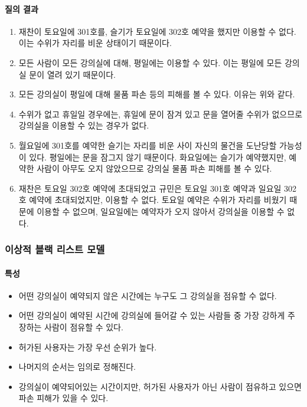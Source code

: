 \documentclass[11pt,a4paper]{article}
\begin{document}
\paragraph{질의 결과}
\begin{enumerate}
\item 재찬이 토요일에 301호를, 슬기가 토요일에 302호 예약을 했지만 이용할 수
없다. 이는 수위가 자리를 비운 상태이기 때문이다.
\item 모든 사람이 모든 강의실에 대해, 평일에는 이용할 수 있다. 이는 평일에 모든
강의실 문이 열려 있기 때문이다.
\item 모든 강의실이 평일에 대해 물품 파손 등의 피해를 볼 수 있다. 이유는 위와
같다.
\item 수위가 없고 휴일일 경우에는, 휴일에 문이 잠겨 있고 문을 열어줄 수위가
없으므로 강의실을 이용할 수 있는 경우가 없다.
\item 월요일에 301호를 예약한 슬기는 자리를 비운 사이 자신의 물건을 도난당할
가능성이 있다. 평일에는 문을 잠그지 않기 때문이다. 화요일에는 슬기가
예약했지만, 예약한 사람이 아무도 오지 않았으므로 강의실 물품 파손 피해를 볼 수
있다.
\item 재찬은 토요일 302호 예약에 초대되었고 규민은 토요일 301호 예약과 일요일
302호 예약에 초대되었지만, 이용할 수 없다. 토요일 예약은 수위가 자리를 비웠기
때문에 이용할 수 없으며, 일요일에는 예약자가 오지 않아서 강의실을 이용할 수
없다.
\end{enumerate}

\subsubsection{이상적 블랙 리스트 모델}

\paragraph{특성}
\begin{itemize}
\item 어떤 강의실이 예약되지 않은 시간에는 누구도 그 강의실을 점유할 수 없다.
\item 어떤 강의실이 예약된 시간에 강의실에 들어갈 수 있는 사람들 중 가장 강하게
주장하는 사람이 점유할 수 있다.
\item 허가된 사용자는 가장 우선 순위가 높다.
\item 나머지의 순서는 임의로 정해진다.
\item 강의실이 예약되어있는 시간이지만, 허가된 사용자가 아닌 사람이 점유하고
있으면 파손 피해가 있을 수 있다.
\end{itemize}
\end{document}
